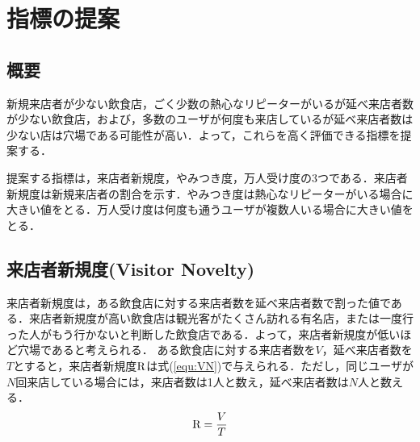 \chapter{指標の提案}
\label{chap:proposal}

\section{概要}
新規来店者が少ない飲食店，ごく少数の熱心なリピーターがいるが延べ来店者数が少ない飲食店，および，多数のユーザが何度も来店しているが延べ来店者数は少ない店は穴場である可能性が高い．よって，これらを高く評価できる指標を提案する．\par
提案する指標は，来店者新規度，やみつき度，万人受け度の3つである．来店者新規度は新規来店者の割合を示す．やみつき度は熱心なリピーターがいる場合に大きい値をとる．万人受け度は何度も通うユーザが複数人いる場合に大きい値をとる．


\section{来店者新規度(Visitor Novelty)}

来店者新規度は，ある飲食店に対する来店者数を延べ来店者数で割った値である．来店者新規度が高い飲食店は観光客がたくさん訪れる有名店，または一度行った人がもう行かないと判断した飲食店である．よって，来店者新規度が低いほど穴場であると考えられる．
ある飲食店に対する来店者数を$V$，延べ来店者数を$T$とすると，来店者新規度$\rm R$は式(\ref{equ:VN})で与えられる．ただし，同じユーザが$N$回来店している場合には，来店者数は1人と数え，延べ来店者数は$N$人と数える．
\begin{equation}
	\label{equ:VN}
	{\rm R} = \frac{V}{T}
\end{equation}


